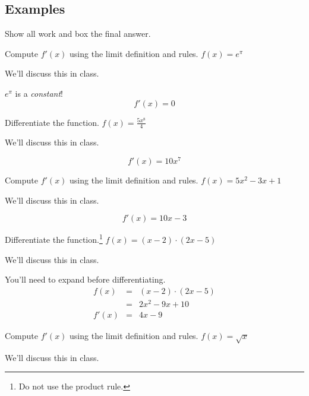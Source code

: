 \documentclass[12pt,addpoints, answers, fleqn]{exam}
\begin{document}
\subsection{Examples}
Show all work and box the final answer.
\begin{questions}
\question Compute $f'\left(x\right)$ using the limit definition and rules.
$ \displaystyle f \left( x \right) = e^\pi$

\begin{solution}
We'll discuss this in class.

$e^\pi$ is a \emph{constant}!
\[
f'\left( x \right) = 0
\]
\end{solution}

\question Differentiate the function.
$ \displaystyle f \left( x \right) = \frac{5x^8}{4}$

\begin{solution}
We'll discuss this in class.

\[
f'\left( x \right) = 10x^7
\]
\end{solution}

\question Compute $f'\left(x\right)$ using the limit definition and rules.
$ \displaystyle f \left( x \right) = 5x^2 - 3x + 1$

\begin{solution}
We'll discuss this in class.

\[
f'\left( x \right) = 10x-3
\]
\end{solution}


\question Differentiate the function.\footnote{Do not use the product rule.}
$ \displaystyle f \left( x \right) = \left( x - 2 \right) \cdot \left( 2x - 5 \right)$

\begin{solution}
We'll discuss this in class.

You'll need to expand before differentiating.
\begin{eqnarray*}
 f \left( x \right) &=& \left( x - 2 \right) \cdot \left( 2x - 5 \right)\\
 &=& 2x^2-9x+10\\
 f'\left(x\right) &=& 4x-9
\end{eqnarray*}

\end{solution}


\question Compute $f'\left(x\right)$ using the limit definition and rules.
$ \displaystyle f \left( x \right) = \sqrt{x}$

\begin{solution}
We'll discuss this in class.


\end{solution}
\end{questions}
\end{document}
